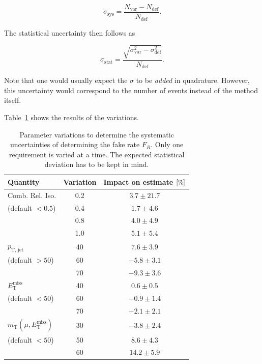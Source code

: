 \begin{equation}
  \label{eq:frsysabs}
  \sigma_{\text{sys}} = \frac{N_{\text{var}} - N_{\text{def}}}{N_{\text{def}}}.
\end{equation}

\noindent The statistical uncertainty then follows as

\begin{equation}
  \label{eq:frstatabs}
  \sigma_{\text{stat}} = \frac{\sqrt{\sigma_{\text{var}}^2 - \sigma_{\text{def}}^2}}{N_{\text{def}}}.
\end{equation}

\noindent Note that one would usually expect the $\sigma$ to be \textit{added} in quadrature. However, this uncertainty would correspond to the number of events instead of the method itself.

Table~\ref{tab:tlratiosys} shows the results of the variations.

\begin{table}[htb!]
  \centering
  \begin{tabular}{|l|c|c|}
    \hline
    Quantity                                        & Variation & Impact on estimate $[\pct]$ \\
    \hline
    \hline
    Comb. Rel. Iso.                                 & 0.2       & $3.7 \pm 21.7$              \\
    (default $< 0.5$)                               & 0.4       & $1.7 \pm 4.6$               \\
    & 0.8       & $4.0 \pm 4.9$               \\
    & 1.0       & $5.1 \pm 5.4$               \\
    \hline
    $p_{\text{T, jet}}$                             & 40        & $7.6 \pm 3.9$               \\
    (default $> 50$)                                & 60        & $-5.8 \pm 3.1$              \\
    & 70        & $-9.3 \pm 3.6$              \\
    \hline
    $E_{\text{T}}^{\text{miss}}$                    & 40        & $0.6 \pm 0.5$               \\
    (default $< 50$)                                & 60        & $-0.9 \pm 1.4$              \\
    & 70        & $-2.1 \pm 2.1$              \\
    \hline
    $m_{\text{T}}(\mu, E_{\text{T}}^{\text{miss}})$ & 30        & $-3.8 \pm 2.4$              \\
    (default $< 50$)                                & 50        & $8.6 \pm 4.3$               \\
    & 60        & $14.2 \pm 5.9$              \\
    \hline
  \end{tabular}
  \caption{Parameter variations to determine the systematic uncertainties of determining the fake rate $F_R$. Only one requirement is varied at a time. The expected statistical deviation has to be kept in mind.}
  \label{tab:tlratiosys}
\end{table}

